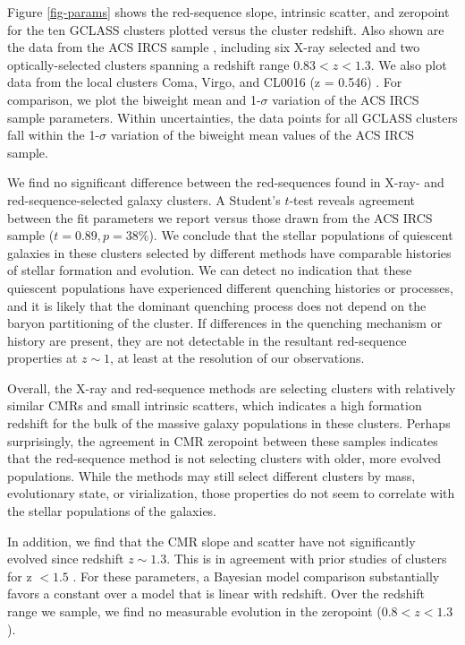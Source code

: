 Figure \ref{fig-params} shows the red-sequence slope, intrinsic scatter, and zeropoint for the ten GCLASS clusters plotted versus the cluster redshift. Also shown are the data from the ACS IRCS sample \citep[][M09]{fordACS}, including six X-ray selected and two optically-selected clusters spanning a redshift range $0.83 < z < 1.3$. We also plot data from the local clusters Coma, Virgo, and CL0016 (z = 0.546) \citep{Bower:1992mb,van-Dokkum:1998wd,Ellis:1997lk}. For comparison, we plot the biweight mean and 1-$\sigma$ variation of the ACS IRCS sample parameters. Within uncertainties, the data points for all GCLASS clusters fall within the 1-$\sigma$ variation of the biweight mean values of the ACS IRCS sample.

We find no significant difference between the red-sequences found in X-ray- and red-sequence-selected galaxy clusters. A Student's $t$-test reveals agreement between the fit parameters we report versus those drawn from the ACS IRCS sample ($t=0.89, p=38\%$). We conclude that the stellar populations of quiescent galaxies in these clusters selected by different methods have comparable histories of stellar formation and evolution.
We can detect no indication that these quiescent populations have experienced different quenching histories or processes, and it is likely that the dominant quenching process does not depend on the baryon partitioning of the cluster.
If differences in the quenching mechanism or history are present, they are not detectable in the resultant red-sequence properties at $z \sim 1$, at least at the resolution of our observations.

Overall, the X-ray and red-sequence methods are selecting clusters with relatively similar CMRs and small intrinsic scatters, which indicates a high formation redshift for the bulk of the massive galaxy populations in these clusters.
Perhaps surprisingly, the agreement in CMR zeropoint between these samples indicates that the red-sequence method is not selecting clusters with older, more evolved populations.
While the methods may still select different clusters by mass, evolutionary state, or virialization, those properties do not seem to correlate with the stellar populations of the galaxies.

In addition, we find that the CMR slope and scatter have not significantly evolved since redshift $z\sim1.3$. This is in agreement with prior studies of clusters for z $< 1.5$ \citep[e.g. M09, ][]{Snyder:2012wq}.
For these parameters, a Bayesian model comparison substantially favors a constant over a model that is linear with redshift. Over the redshift range we sample, we find no measurable evolution in the zeropoint ($0.8 < z < 1.3$).

